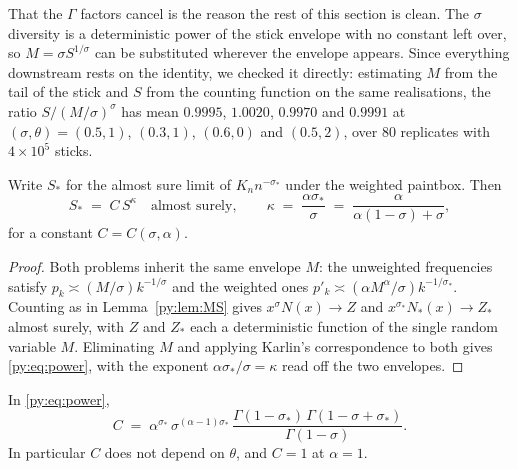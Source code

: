 That the $\Gamma$ factors cancel is the reason the rest of this section is clean. The
$\sigma$ diversity is a deterministic power of the stick envelope with no constant left over, so
$M = \sigma S^{1/\sigma}$ can be substituted wherever the envelope appears. Since everything downstream rests on the identity, we checked it directly: estimating $M$ from the tail of the
stick and $S$ from the counting function on the same realisations, the ratio
$S/(M/\sigma)^{\sigma}$ has mean $0.9995$, $1.0020$, $0.9970$ and $0.9991$ at
$(\sigma,\theta) = (0.5,1)$, $(0.3,1)$, $(0.6,0)$ and $(0.5,2)$, over $80$ replicates with
$4\times10^{5}$ sticks.

\begin{proposition}
\label{py:prop:power}
Write $S_*$ for the almost sure limit of $K_n n^{-\sigma_*}$ under the weighted paintbox. Then
\begin{equation}
S_* \;=\; C\, S^{\kappa} \quad\text{almost surely},
\qquad
\kappa \;=\; \frac{\alpha\sigma_*}{\sigma} \;=\; \frac{\alpha}{\alpha(1-\sigma)+\sigma},
\label{py:eq:power}
\end{equation}
for a constant $C = C(\sigma,\alpha)$.
\end{proposition}

\begin{proof}
Both problems inherit the same envelope $M$: the unweighted frequencies satisfy
$p_k \asymp (M/\sigma)k^{-1/\sigma}$ and the weighted ones
$p'_k \asymp (\alpha M^{\alpha}/\sigma)k^{-1/\sigma_*}$. Counting as in Lemma~\ref{py:lem:MS} gives
$x^{\sigma}N(x) \to Z$ and $x^{\sigma_*}N_*(x) \to Z_*$ almost surely, with $Z$ and $Z_*$ each a
deterministic function of the single random variable $M$. Eliminating $M$ and applying Karlin's
correspondence to both gives \eqref{py:eq:power}, with the exponent
$\alpha\sigma_*/\sigma = \kappa$ read off the two envelopes.
\end{proof}

\begin{proposition}
\label{py:prop:constant}
In \eqref{py:eq:power},
\begin{equation}
C \;=\; \alpha^{\sigma_*}\,\sigma^{(\alpha-1)\sigma_*}\,
\frac{\Gamma(1-\sigma_*)\,\Gamma(1-\sigma+\sigma_*)}{\Gamma(1-\sigma)} .
\label{py:eq:C}
\end{equation}
In particular $C$ does not depend on $\theta$, and $C = 1$ at $\alpha = 1$.
\end{proposition}

